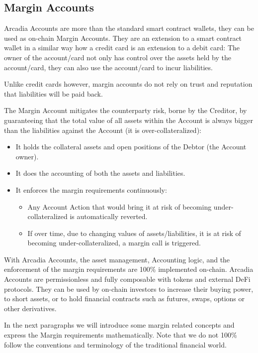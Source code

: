 \documentclass[sigconf,nonacm]{acmart}
\begin{document}
\subsection{Margin Accounts}
\label{subsec:margin-accounts}
Arcadia Accounts are more than the standard smart contract wallets, they can be used as on-chain Margin Accounts.
They are an extension to a smart contract wallet in a similar way how a credit card is an extension to a debit card:
The owner of the account/card not only has control over the assets held by the account/card,
they can also use the account/card to incur liabilities.

Unlike credit cards however, margin accounts do not rely on trust and reputation that liabilities will be paid back.

The Margin Account mitigates the counterparty risk, borne by the Creditor,
by guaranteeing that the total value of all assets within the Account is always bigger than the liabilities against the Account (it is over-collateralized):
\begin{itemize}
    \item It holds the collateral assets and open positions of the Debtor (the Account owner).
    \item It does the accounting of both the assets and liabilities.
    \item It enforces the margin requirements continuously:
    \begin{itemize}
        \item Any Account Action that would bring it at risk of becoming under-collateralized is automatically reverted.
        \item If over time, due to changing values of assets/liabilities, it is at risk of becoming under-collateralized, a margin call is triggered.
    \end{itemize}
\end{itemize}

With Arcadia Accounts, the asset management, Accounting logic, and the enforcement of the margin requirements are 100\% implemented on-chain.
Arcadia Accounts are permissionless and fully composable with tokens and external DeFi protocols.
They can be used by on-chain investors to increase their buying power, to short assets, or to hold financial contracts such as futures, swaps, options or other derivatives.

In the next paragraphs we will introduce some margin related concepts and express the Margin requirements mathematically.
Note that we do not 100\% follow the conventions and terminology of the traditional financial world.
\end{document}

